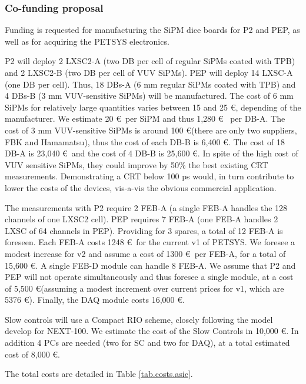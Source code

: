 \subsubsection*{Co-funding proposal}
Funding is requested for manufacturing the SiPM dice boards for P2 and PEP, as well as for acquiring the PETSYS
electronics. 

P2 will deploy 2 LXSC2-A (two DB per cell of regular SiPMs coated with TPB) and 2 LXSC2-B (two DB per cell of VUV SiPMs). PEP will deploy 14 LXSC-A (one DB per cell). Thus, 18 DBs-A (6 mm regular SiPMs coated with TPB) and 4 DBs-B (3 mm VUV-sensitive SiPMs) will be manufactured. The cost of 6 mm SiPMs for relatively large quantities varies between 15 and 25 \euro, depending of the manufacturer. We estimate 20 \euro ~per SiPM and thus 1,280 \euro 
~per DB-A. The cost of 3 mm VUV-sensitive SiPMs is around 100 \euro (there are only two suppliers, FBK and Hamamatsu), thus the cost of each DB-B is 6,400 \euro. The cost of 18 DB-A is 23,040 \euro\ and the cost
of 4 DB-B is 25,600 \euro. In spite of the high cost of VUV sensitive SiPMs, they could improve by 50\% the best existing CRT measurements. Demonstrating a CRT below 100 ps would, in turn contribute to lower the costs of the devices, vis-a-vis the obvious commercial application.

The measurements with P2 require 2 FEB-A (a single FEB-A handles the 128 channels of one LXSC2 cell). PEP requires 7 FEB-A (one FEB-A handles 2 LXSC of 64 channels in PEP). Providing for 3 spares, a total of 12 FEB-A is foreseen. Each FEB-A costs 1248 \euro\ for the current v1 of PETSYS. We foresee a modest increase for v2 and assume a cost of 1300 \euro\ per FEB-A, for a total of 15,600 \euro. A single FEB-D module can handle 8 FEB-A. We assume that P2 and PEP will not operate simultaneously and thus foresee a single module, at a cost of 5,500 \euro (assuming a modest increment over current prices for v1, which are 5376 \euro). Finally, the DAQ module costs 16,000 \euro.

Slow controls will use a Compact RIO scheme, closely following the model develop for NEXT-100. We estimate the cost of the Slow Controls in 10,000 \euro. In addition 4 PCs are needed (two for SC and two for DAQ), at a total estimated cost of 8,000 \euro. 

The total costs are detailed in Table \ref{tab.costs.asic}.

